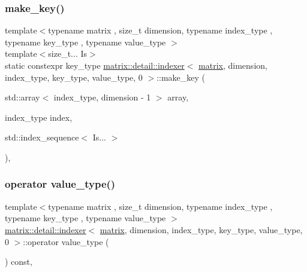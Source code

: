 \subsubsection{\texorpdfstring{make\+\_\+key()}{make\_key()}}
{\footnotesize\ttfamily template$<$typename matrix , size\+\_\+t dimension, typename index\+\_\+type , typename key\+\_\+type , typename value\+\_\+type $>$ \\
template$<$size\+\_\+t... Is$>$ \\
static constexpr key\+\_\+type \hyperlink{structmatrix_1_1detail_1_1indexer}{matrix\+::detail\+::indexer}$<$ \hyperlink{structmatrix_1_1matrix}{matrix}, dimension, index\+\_\+type, key\+\_\+type, value\+\_\+type, 0 $>$\+::make\+\_\+key (\begin{DoxyParamCaption}\item[{std\+::array$<$ index\+\_\+type, dimension -\/ 1 $>$}]{array,  }\item[{index\+\_\+type}]{index,  }\item[{std\+::index\+\_\+sequence$<$ Is... $>$}]{ }\end{DoxyParamCaption})\hspace{0.3cm}{\ttfamily [inline]}, {\ttfamily [static]}}

\mbox{\label{structmatrix_1_1detail_1_1indexer_3_01matrix_00_01dimension_00_01index__type_00_01key__type_00_01value__type_00_010_01_4_acb09c61514021a6302f54c3f6218d646}} 
\subsubsection{\texorpdfstring{operator value\+\_\+type()}{operator value\_type()}}
{\footnotesize\ttfamily template$<$typename matrix , size\+\_\+t dimension, typename index\+\_\+type , typename key\+\_\+type , typename value\+\_\+type $>$ \\
\hyperlink{structmatrix_1_1detail_1_1indexer}{matrix\+::detail\+::indexer}$<$ \hyperlink{structmatrix_1_1matrix}{matrix}, dimension, index\+\_\+type, key\+\_\+type, value\+\_\+type, 0 $>$\+::operator value\+\_\+type (\begin{DoxyParamCaption}{ }\end{DoxyParamCaption}) const\hspace{0.3cm}{\ttfamily [inline]}, {\ttfamily [explicit]}}

